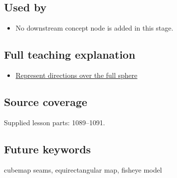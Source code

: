 \subsection{Used by}\label{appendix-fc99ad39f351-used-by}

\begin{itemize}
\tightlist
\item
  No downstream concept node is added in this stage.
\end{itemize}

\subsection{Full teaching explanation}\label{appendix-fc99ad39f351-full-teaching-explanation}

\begin{itemize}
\tightlist
\item
  \hyperref[02-foundations-ii-ch035-represent-directions-over-the-full-sphere]{Represent directions over the full sphere}
\end{itemize}

\subsection{Source coverage}\label{appendix-fc99ad39f351-source-coverage}

Supplied lesson parts: 1089--1091.

\subsection{Future keywords}\label{appendix-fc99ad39f351-future-keywords}

cubemap seams, equirectangular map, fisheye model
